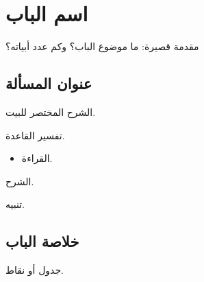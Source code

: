 \chapter{اسم الباب}

مقدمة قصيرة: ما موضوع الباب؟ وكم عدد أبياته؟

\section{عنوان المسألة}


\begin{mufradat}
\end{mufradat}

\maana الشرح المختصر للبيت.

\begin{qiraat}
\end{qiraat}

\begin{qaida}
تفسير القاعدة.
\end{qaida}

\begin{amthila}
\begin{itemize}
\item {}  \ila{} القراءة.
\end{itemize}
\end{amthila}

\begin{tahrir}
الشرح.
\end{tahrir}

\begin{tanbih}
تنبيه.
\end{tanbih}

\section{خلاصة الباب}
\begin{khulasa}[خلاصة]
جدول أو نقاط.
\end{khulasa}

